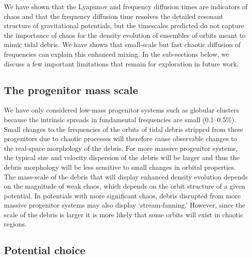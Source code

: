 \documentclass[letterpaper,12pt,preprint]{aastex}
\newcommand{\chchchanges}[1]{{\color{red} {#1}}}
\begin{document}
We have shown that the Lyapunov and frequency diffusion times are indicators of chaos and that the frequency diffusion time resolves the detailed resonant structure of gravitational potentials, but the timescales predicted do not capture the importance of chaos for the density evolution of ensembles of orbits meant to mimic tidal debris. We have shown that small-scale but fast chaotic diffusion of \chchchanges{frequencies} can explain this enhanced mixing. In the sub-sections below, we discuss a few important limitations that remain for exploration in future work.

\subsection{The progenitor mass scale}

We have only considered low-mass progenitor systems such as globular clusters because the intrinsic spreads in fundamental frequencies are small (0.1--0.5\%). Small changes to the frequencies of the orbits of tidal debris \chchchanges{stripped} from these progenitors due to chaotic processes will therefore cause observable changes to the real-space morphology of the debris. For more massive progenitor systems, the typical size and velocity dispersion of the debris will be larger and thus the debris morphology will be less sensitive to small changes in orbital properties. The mass-scale of the debris that will display enhanced density evolution depends on the magnitude of weak chaos, which depends on the orbit structure of a given potential. In potentials with more significant chaos, debris disrupted from more massive progenitor systems may also display `stream-fanning.' However, since the scale of the debris is larger it is more likely that some orbits will exist in chaotic regions.

\subsection{Potential choice}
\end{document}
